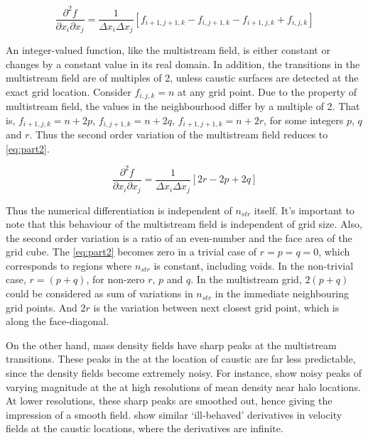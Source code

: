 \begin{equation}
\label{eq:part1}
\frac{\partial^2 f}{\partial x_i \partial x_j} = \frac{1}{\Delta x_i \Delta x_j}  \left[f_{i+1,j+1,k}-f_{i,j+1,k}-f_{i+1,j,k}+f_{i,j,k} \right]
\end{equation}

An integer-valued function, like the multistream field, is either constant or changes by a constant value in its real domain. In addition, the transitions in the multistream field are of multiples of 2, unless caustic surfaces are detected at the exact grid location. Consider $f_{i,j,k} = n$ at any grid point. Due to the property of multistream field, the values in the neighbourhood differ by a multiple of 2. That is,  $f_{i+1,j,k} = n+2p$, $f_{i,j+1,k} = n+2q$, $f_{i+1,j+1,k} = n+2r$, for some integers $p$, $q$ and $r$. Thus the second order variation of the multistream field reduces to \autoref{eq:part2}. 

\begin{equation}
\label{eq:part2}
\frac{\partial^2 f}{\partial x_i \partial x_j} = \frac{1}{\Delta x_i \Delta x_j}  \left[ 2r - 2p + 2q \right]
\end{equation}

Thus the numerical differentiation is independent of $n_{str}$ itself. It's important to note that this behaviour of the multistream field is independent of grid size. Also, the second order variation is a ratio of an even-number and the face area of the grid cube. The \autoref{eq:part2} becomes zero in a trivial case of $r = p = q = 0$, which corresponds to regions where $n_{str}$ is constant, including voids. In the non-trivial case, $r=(p+q)$, for non-zero $r$, $p$ and $q$. In the multistream grid, $2(p+q)$ could be considered as sum of variations in $n_{str}$ in the immediate neighbouring grid points. And $2r$ is the variation between next closest grid point, which is along the face-diagonal. 

On the other hand, mass density fields have sharp peaks at the multistream transitions. These peaks in the at the location of caustic are far less predictable, since the density fields become extremely noisy. For instance,\cite{Vogelsberger2011b} show noisy peaks of varying magnitude at the at high resolutions of mean density near halo locations. At lower resolutions, these sharp peaks are smoothed out, hence giving the impression of a smooth field. \cite{Hahn2015a} show similar `ill-behaved' derivatives in velocity fields at the caustic locations, where the derivatives are infinite.   
